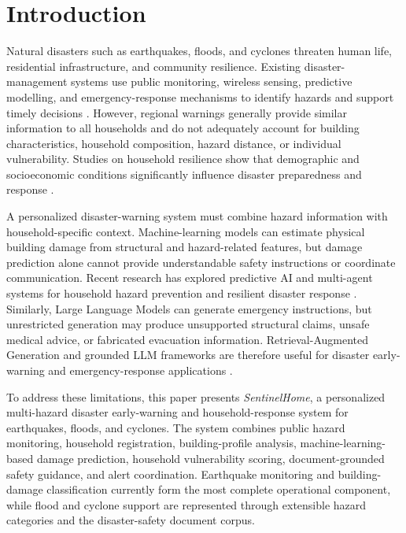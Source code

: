 \section{Introduction}
\label{intro}

Natural disasters such as earthquakes, floods, and cyclones threaten human life, residential infrastructure, and community resilience. Existing disaster-management systems use public monitoring, wireless sensing, predictive modelling, and emergency-response mechanisms to identify hazards and support timely decisions \cite{zeeshan2025flood, meenakshi2023wireless}. However, regional warnings generally provide similar information to all households and do not adequately account for building characteristics, household composition, hazard distance, or individual vulnerability. Studies on household resilience show that demographic and socioeconomic conditions significantly influence disaster preparedness and response \cite{fahad2023household}.

A personalized disaster-warning system must combine hazard information with household-specific context. Machine-learning models can estimate physical building damage from structural and hazard-related features, but damage prediction alone cannot provide understandable safety instructions or coordinate communication. Recent research has explored predictive AI and multi-agent systems for household hazard prevention and resilient disaster response \cite{homeguardian2024predictive, aththanayake2026resqconnect}. Similarly, Large Language Models can generate emergency instructions, but unrestricted generation may produce unsupported structural claims, unsafe medical advice, or fabricated evacuation information. Retrieval-Augmented Generation and grounded LLM frameworks are therefore useful for disaster early-warning and emergency-response applications \cite{nugroho2025rag, xie2025deepseek, cui2026llmagents}.

To address these limitations, this paper presents \textit{SentinelHome}, a personalized multi-hazard disaster early-warning and household-response system for earthquakes, floods, and cyclones. The system combines public hazard monitoring, household registration, building-profile analysis, machine-learning-based damage prediction, household vulnerability scoring, document-grounded safety guidance, and alert coordination. Earthquake monitoring and building-damage classification currently form the most complete operational component, while flood and cyclone support are represented through extensible hazard categories and the disaster-safety document corpus.

